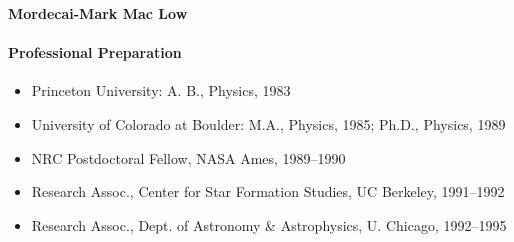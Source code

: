 \documentclass[11pt]{article}
\begin{document}
\pagestyle{empty}
%
\centerline{\bf Mordecai-Mark Mac Low}
\smallskip

\paragraph{Professional Preparation}
\begin{itemize} %
\setlength{\itemsep}{-\parsep}
\setlength{\topsep}{-\parsep}
\setlength{\partopsep}{-\parsep}
\item  Princeton University:  A. B., Physics, 1983
\item University of Colorado at Boulder:  
                          M.A., Physics, 1985;  Ph.D., Physics, 1989

\item {NRC Postdoctoral Fellow, NASA Ames,  1989--1990}  
\item {Research Assoc., Center for Star Formation Studies, UC Berkeley,  1991--1992}  
\item {Research Assoc.,  Dept. of Astronomy \& Astrophysics, U. Chicago,  1992--1995} 
\end{itemize}
\end{document}
